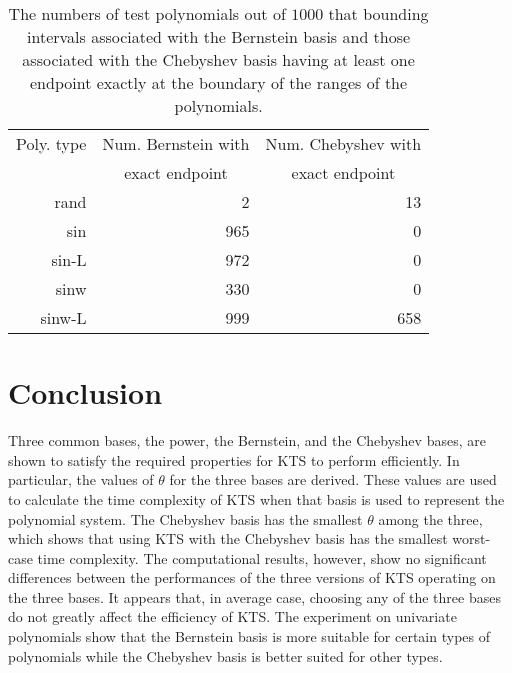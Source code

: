 \documentclass[12pt]{article}
\begin{document}
\begin{table}
\caption{The numbers of test polynomials out of $1000$ that
bounding intervals associated with the Bernstein basis and those
associated with the Chebyshev basis having at least one endpoint
exactly at the boundary of the ranges of the polynomials.
\label{table_bc} }
\begin{center}
\begin{tabular}{|r|r|r|}
\hline Poly. type & Num. Bernstein with & Num. Chebyshev with \\
& \multicolumn{1}{c}{ exact endpoint}\vline & \multicolumn{1}{c}{ exact endpoint}\vline  \\
 \hline \hline
rand & 2 & 13 \\
sin & 965 & 0 \\
sin-L & 972 & 0\\
sinw & 330 & 0 \\
sinw-L & 999 & 658 \\
\hline
\end{tabular}
\end{center}
\end{table}

\section{Conclusion}

Three common bases, the power, the Bernstein, and the Chebyshev
bases, are shown to satisfy the required properties for KTS to
perform efficiently. In particular, the values of $\theta$ for the
three bases are derived. These values are used to calculate the
time complexity of KTS when that basis is used to represent the
polynomial system.  The Chebyshev basis has the smallest $\theta$
among the three, which shows that using KTS with the Chebyshev
basis has the smallest worst-case time complexity.  The
computational results, however, show no significant differences
between the performances of the three versions of KTS operating
on the three bases. It appears that, in average case, choosing any
of the three bases do not greatly affect the efficiency of KTS.
The experiment on univariate polynomials show that the Bernstein
basis is more suitable for certain types of polynomials while the
Chebyshev basis is better suited for other types.


\end{document}
